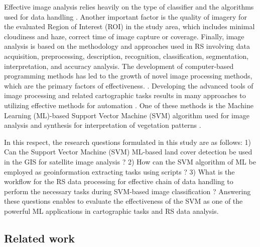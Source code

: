 \documentclass[earth,article,submit,pdftex,moreauthors]{Definitions/mdpi}
\begin{document}
{Effective image analysis relies heavily on} the type of {classifier} and the algorithms used for data handling{ }\cite{Lemenkova202212}. Another important factor {is} the quality of imagery for the evaluated {Region of Interest (ROI)} in {the} study area{, which includes} minimal cloudiness and haze, correct time of image capture {or} coverage{.} Finally, {image analysis is based on} the methodology and approaches {used in} {RS} {involving} data acquisition, preprocessing, description, recognition, classification, segmentation, interpretation, and accuracy analysis. The {development} of {computer-based} {programming} methods {has led to} the {growth} of {novel} {image processing} methods, {which} are the primary factors of {effectiveness}. \cite{Duncan,jimaging9050098,Purkis,info14040249,DIOUF2001129}. Developing the advanced tools of image processing and related cartographic tasks results in many approaches to utilizing effective methods {for automation} \cite{SUOMALAINEN2021112691,OlsonAnderson,Lemenkova202227,Ali,Olsonetal2019,Lemenkova202229}. {One of these methods is the {Machine Learning} (ML)-based Support Vector Machine (SVM) algorithm used for} image analysis and synthesis for interpretation of vegetation patterns \cite{PUERTAS2013112,PETROPOULOS201170,ANEES2024102732,IBRAHIM2024100561}.

{In this respect}{, the research questions formulated in this study are as follows: 1) Can the Support Vector Machine (SVM) {ML}-based land cover detection be used in the{ GIS} for satellite image analysis ? 2) How can the SVM algorithm of ML be employed as geoinformation extracting tasks using scripts ? 3) What is the workflow for the {RS} data processing for effective chain of data handling to perform{ }the necessary tasks during SVM-based image classification ? Answering these questions enables to evaluate the effectiveness of the {SVM} as one of the powerful ML applications in cartographic tasks and RS data analysis.}

\subsection{Related work}
\end{document}
